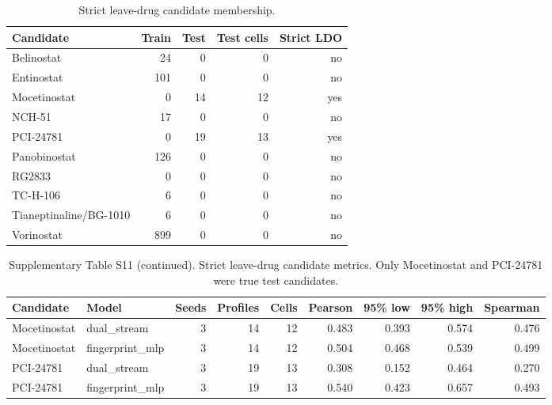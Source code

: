 \begingroup
\small
\begin{table}[H]
\centering
\caption{Strict leave-drug candidate membership.}
\label{tab:s_ldo_member}
\begin{tabular}{@{}lrrrr@{}}
\toprule
Candidate & Train & Test & Test cells & Strict LDO \\
\midrule
Belinostat & 24 & 0 & 0 & no \\
Entinostat & 101 & 0 & 0 & no \\
Mocetinostat & 0 & 14 & 12 & yes \\
NCH-51 & 17 & 0 & 0 & no \\
PCI-24781 & 0 & 19 & 13 & yes \\
Panobinostat & 126 & 0 & 0 & no \\
RG2833 & 0 & 0 & 0 & no \\
TC-H-106 & 6 & 0 & 0 & no \\
Tianeptinaline/BG-1010 & 6 & 0 & 0 & no \\
Vorinostat & 899 & 0 & 0 & no \\
\bottomrule
\end{tabular}
\end{table}
\endgroup
\begingroup
\scriptsize
\begin{table}[H]
\centering
\caption*{Supplementary Table S11 (continued). Strict leave-drug candidate metrics. Only Mocetinostat and PCI-24781 were true test candidates.}
\begin{tabular}{@{}llrrrrrrr@{}}
\toprule
Candidate & Model & Seeds & Profiles & Cells & Pearson & 95\% low & 95\% high & Spearman \\
\midrule
Mocetinostat & dual\_stream & 3 & 14 & 12 & 0.483 & 0.393 & 0.574 & 0.476 \\
Mocetinostat & fingerprint\_mlp & 3 & 14 & 12 & 0.504 & 0.468 & 0.539 & 0.499 \\
PCI-24781 & dual\_stream & 3 & 19 & 13 & 0.308 & 0.152 & 0.464 & 0.270 \\
PCI-24781 & fingerprint\_mlp & 3 & 19 & 13 & 0.540 & 0.423 & 0.657 & 0.493 \\
\bottomrule
\end{tabular}
\end{table}
\endgroup
